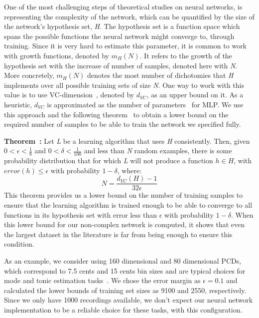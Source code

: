 \documentclass{sig-alternate}
\begin{document}
One of the most challenging steps of theoretical studies on neural networks, is representing the complexity of the network, which can be quantified by the size of the network's hypothesis set, \textit{H}. The hypothesis set is a function space which spans the possible functions the neural network might converge to, through training. Since it is very hard to estimate this parameter, it is common to work with growth functions, denoted by \textit{$m_H(N)$}. It refers to the growth of the hypothesis set with the increase of number of samples, denoted here with \textit{N}. More concretely, \textit{$m_H(N)$} denotes the most number of dichotomies that \textit{H} implements over all possible training sets of size \textit{N}. One way to work with this value is to use VC-dimension~\cite{vc-dimension}, denoted by $d_{VC}$, as an upper bound on it. As a heuristic, $d_{VC}$ is approximated as the number of parameters~\cite{bartlett} for MLP. We use this approach and the following theorem~\cite{lower_bound} to obtain a lower bound on the required number of samples to be able to train the network we specified fully. 

\textbf{Theorem~\cite{lower_bound}:} Let \textit{L} be a learning algorithm that uses \textit{H} consistently. Then, given $0 < \epsilon < \frac{1}{8}$ and $0 < \delta < \frac{1}{100}$ and less than \textit{N} random examples, there is some probability distribution that for which \textit{L} will not produce a function $h \in H$, with $error(h) \leq \epsilon$ with probability $1 - \delta$, where:
\begin{equation}
N = \frac{d_{VC}(H) - 1}{32\epsilon}
\end{equation}
This theorem provides us a lower bound on the number of training samples to ensure that the learning algorithm is trained enough to be able to converge to all functions in its hypothesis set with error less than $\epsilon$ with probability $1-\delta$. When this lower bound for our non-complex network is computed, it shows that even the largest dataset in the literature is far from being enough to ensure this condition. 

As an example, we consider using 160 dimensional and 80 dimensional PCDs, which correspond to 7.5 cents and 15 cents bin sizes and are typical choices for mode and tonic estimation tasks~\cite{chordia,bozkurt_makam,bozkurt_tonic}. We chose the error margin as $\epsilon=0.1$ and calculated the lower bounds of training set sizes as 9100 and 2550, respectively. Since we only have 1000 recordings available, we don't expect our neural network implementation to be a reliable choice for these tasks, with this configuration. 
\end{document}
